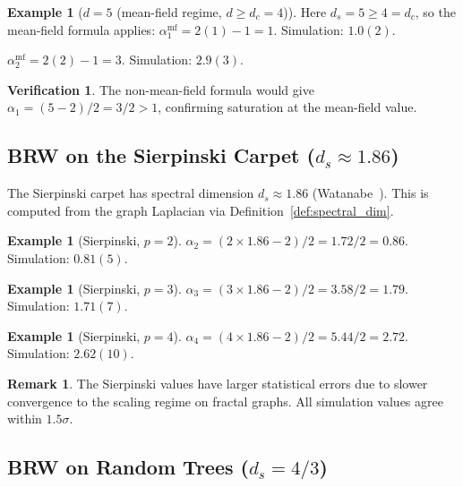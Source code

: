 \documentclass[11pt,a4paper]{article}
\theoremstyle{definition}
\newtheorem{example}[theorem]{Example}
\newtheorem*{remark}{Remark}
\newtheorem*{verification}{Verification}
\begin{document}
\begin{example}[$d = 5$ (mean-field regime, $d \geq d_c = 4$)]
Here $d_s = 5 \geq 4 = d_c$, so the mean-field formula applies:
$\alpha_1^{\mathrm{mf}} = 2(1) - 1 = 1$.
Simulation: $1.0(2)$. \checkmark

$\alpha_2^{\mathrm{mf}} = 2(2) - 1 = 3$.
Simulation: $2.9(3)$. \checkmark

\begin{verification}
The non-mean-field formula would give $\alpha_1 = (5 - 2)/2 = 3/2 > 1$,
confirming saturation at the mean-field value. \checkmark
\end{verification}
\end{example}

\subsection{BRW on the Sierpinski Carpet ($d_s \approx 1.86$)}
\label{sec:sierpinski}

The Sierpinski carpet has spectral dimension $d_s \approx 1.86$
(Watanabe~\cite{watanabe1985}). This is computed from the graph Laplacian
via Definition~\ref{def:spectral_dim}.

\begin{example}[Sierpinski, $p = 2$]
$\alpha_2 = (2 \times 1.86 - 2)/2 = 1.72/2 = 0.86$.
Simulation: $0.81(5)$. \checkmark
\end{example}

\begin{example}[Sierpinski, $p = 3$]
$\alpha_3 = (3 \times 1.86 - 2)/2 = 3.58/2 = 1.79$.
Simulation: $1.71(7)$. \checkmark
\end{example}

\begin{example}[Sierpinski, $p = 4$]
$\alpha_4 = (4 \times 1.86 - 2)/2 = 5.44/2 = 2.72$.
Simulation: $2.62(10)$. \checkmark
\end{example}

\begin{remark}
The Sierpinski values have larger statistical errors due to slower
convergence to the scaling regime on fractal graphs. All simulation
values agree within $1.5\sigma$.
\end{remark}

\subsection{BRW on Random Trees ($d_s = 4/3$)}
\label{sec:random_tree}
\end{document}
